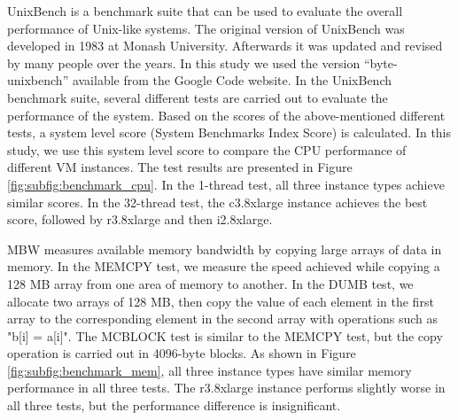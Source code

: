 UnixBench is a benchmark suite that can be used to evaluate the overall performance of Unix-like systems. The original version of UnixBench was developed in 1983 at Monash University. Afterwards it was updated and revised by many people over the years. In this study we used the version ``byte-unixbench'' available from the Google Code website. In the UnixBench benchmark suite, several different tests are carried out to evaluate the performance of the system. Based on the scores of the above-mentioned different tests, a system level score (System Benchmarks Index Score) is calculated. In this study, we use this system level score to compare the CPU performance of different VM instances. The test results are presented in Figure \ref{fig:subfig:benchmark_cpu}. In the 1-thread test, all three instance types achieve similar scores. In the 32-thread test, the c3.8xlarge instance achieves the best score, followed by r3.8xlarge and then i2.8xlarge. 

MBW measures available memory bandwidth by copying large arrays of data in memory. In the MEMCPY test, we measure the speed achieved while copying a 128 MB array from one area of memory to another. In the DUMB test, we allocate two arrays of 128 MB, then copy the value of each element in the first array to the corresponding element in the second array with operations such as "b[i] = a[i]". The MCBLOCK test is similar to the MEMCPY test, but the copy operation is carried out in 4096-byte blocks. As shown in Figure \ref{fig:subfig:benchmark_mem}, all three instance types have similar memory performance in all three tests. The r3.8xlarge instance performs slightly worse in all three tests, but the performance difference is insignificant. 

